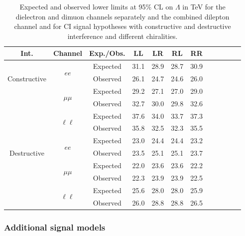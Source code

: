 \begin{table}[htp]
\begin{center}
\caption{Expected and observed lower limits at 95$\%$ CL on $\Lambda$ in TeV for the dielectron and dimuon channels separately and the combined dilepton channel and for CI signal hypotheses with constructive and destructive interference and different chiralities.}
{\begin{tabular}{c c c c c c c c c c c c}\toprule
Int. & Channel & Exp./Obs. & LL & LR & RL & RR \\
\midrule
\multirow{3}{*}[-1.5em]{\begin{sideways}Constructive\end{sideways}} & \multirow{2}{*}{$ee$} & Expected & 31.1 & 28.9 & 28.7 & 30.9 \\
& & Observed & 26.1 & 24.7 & 24.6 & 26.0 \\
\cmidrule{2-7}
 & \multirow{2}{*}{$\mu\mu$} & Expected & 29.2 & 27.1 & 27.0 & 29.0 \\
& & Observed & 32.7 & 30.0 & 29.8 & 32.6 \\
\cmidrule{2-7}
 & \multirow{2}{*}{$\ell\ell$} & Expected & 37.6 & 34.0 & 33.7 & 37.3 \\
& & Observed & 35.8 & 32.5 & 32.3 & 35.5 \\
\midrule
\multirow{3}{*}[-1.5em]{\begin{sideways}Destructive\end{sideways}} & \multirow{2}{*}{$ee$} & Expected & 23.0 & 24.4 & 24.4 & 23.2 \\
& & Observed & 23.5 & 25.1 & 25.1 & 23.7 \\
\cmidrule{2-7}
 & \multirow{2}{*}{$\mu\mu$} & Expected & 22.0 & 23.6 & 23.6 & 22.2 \\
& & Observed & 22.3 & 23.9 & 23.9 & 22.5 \\
\cmidrule{2-7}
 & \multirow{2}{*}{$\ell\ell$} & Expected & 25.6 & 28.0 & 28.0 & 25.9 \\
& & Observed & 26.0 & 28.8 & 28.8 & 26.5 \\
\bottomrule\end{tabular}}
\label{tab:lambdaLimits1}
\end{center}
\end{table}


\subsubsection{Additional signal models}
\label{sec:addlSigModels}

